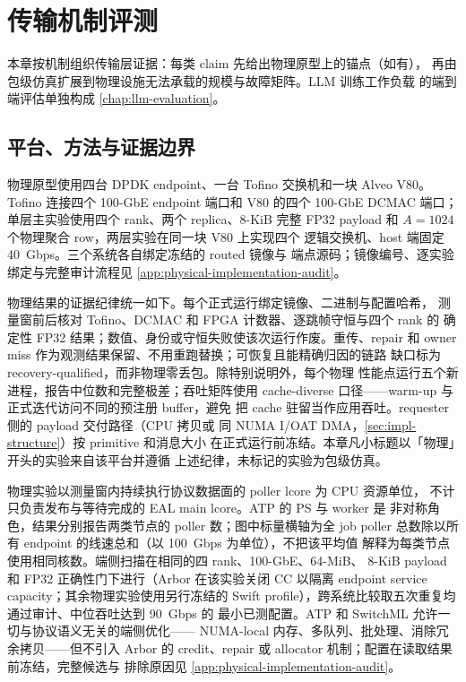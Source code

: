 \chapter{传输机制评测}
\label{chap:evaluation}
\label{chap:simulation}
\label{sec:eval-simulation}

本章按机制组织传输层证据：每类 claim 先给出物理原型上的锚点（如有），
再由包级仿真扩展到物理设施无法承载的规模与故障矩阵。LLM 训练工作负载
的端到端评估单独构成 \cref{chap:llm-evaluation}。

\section{平台、方法与证据边界}
\label{ssec:eval-testbed}
\label{ssec:eval-setup}

物理原型使用四台 DPDK endpoint、一台 Tofino 交换机和一块 Alveo
V80。Tofino 连接四个 100-GbE endpoint 端口和 V80 的四个 100-GbE
DCMAC 端口；单层主实验使用四个 rank、两个 replica、8-KiB 完整 FP32
payload 和 $A=1024$ 个物理聚合 row，两层实验在同一块 V80 上实现四个
逻辑交换机、host 端固定 40~Gbps。三个系统各自绑定冻结的 routed 镜像与
端点源码；镜像编号、逐实验绑定与完整审计流程见
\cref{app:physical-implementation-audit}。

物理结果的证据纪律统一如下。每个正式运行绑定镜像、二进制与配置哈希，
测量窗前后核对 Tofino、DCMAC 和 FPGA 计数器、逐跳帧守恒与四个 rank 的
确定性 FP32 结果；数值、身份或守恒失败使该次运行作废。重传、repair 和
owner miss 作为观测结果保留、不用重跑替换；可恢复且能精确归因的链路
缺口标为 recovery-qualified，而非物理零丢包。除特别说明外，每个物理
性能点运行五个新进程，报告中位数和完整极差；吞吐矩阵使用
cache-diverse 口径——warm-up 与正式迭代访问不同的预注册 buffer，避免
把 cache 驻留当作应用吞吐。requester 侧的 payload 交付路径（CPU 拷贝或
同 NUMA I/OAT DMA，\cref{sec:impl-structure}）按 primitive 和消息大小
在正式运行前冻结。本章凡小标题以「物理」开头的实验来自该平台并遵循
上述纪律，未标记的实验为包级仿真。

\label{sssec:eval-endpoint-cpu}
物理实验以测量窗内持续执行协议数据面的 poller lcore 为 CPU 资源单位，
不计只负责发布与等待完成的 EAL main lcore。ATP 的 PS 与 worker 是
非对称角色，结果分别报告两类节点的 poller 数；图中标量横轴为全 job
poller 总数除以所有 endpoint 的线速总和（以 100~Gbps 为单位），不把该平均值
解释为每类节点使用相同核数。端侧扫描在相同的四 rank、100-GbE、64-MiB、
8-KiB payload 和 FP32 正确性门下进行（Arbor 在该实验关闭 CC 以隔离
endpoint service capacity；其余物理实验使用另行冻结的 Swift
profile），跨系统比较取五次重复均通过审计、中位吞吐达到 90~Gbps 的
最小已测配置。ATP 和 SwitchML 允许一切与协议语义无关的端侧优化——
NUMA-local 内存、多队列、批处理、消除冗余拷贝——但不引入 Arbor 的
credit、repair 或 allocator 机制；配置在读取结果前冻结，完整候选与
排除原因见 \cref{app:physical-implementation-audit}。

